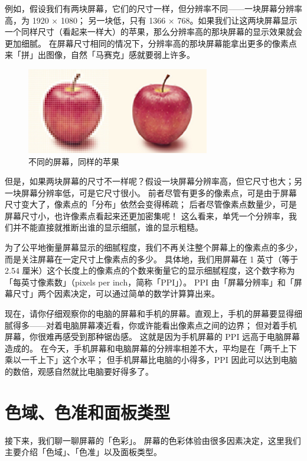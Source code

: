 例如，假设我们有两块屏幕，它们的尺寸一样，但分辨率不同——一块屏幕分辨率高，为 1920 × 1080；
另一块低，只有 1366 × 768。如果我们让这两块屏幕显示一个同样尺寸（看起来一样大）的苹果，那么分辨率高的那块屏幕的显示效果就会更加细腻。
在屏幕尺寸相同的情况下，分辨率高的那块屏幕能拿出更多的像素点来「拼」出图像，自然「马赛克」感就要弱上许多。

\begin{figure}[htb!]
  \centering
  \includegraphics[width=8cm]{assets/Different_Apple.jpg}
  \caption{不同的屏幕，同样的苹果}
  \label{Different_Apple}
\end{figure}

但是，如果两块屏幕的尺寸不一样呢？假设一块屏幕分辨率高，但它尺寸也大；另一块屏幕分辨率低，可是它尺寸很小。
前者尽管有更多的像素点，可是由于屏幕尺寸变大了，像素点的「分布」依然会变得稀疏；
后者尽管像素点数量少，可是屏幕尺寸小，也许像素点看起来还更加密集呢！
这么看来，单凭一个分辨率，我们并不能直接就推断出谁的显示细腻，谁的显示粗糙。

为了公平地衡量屏幕显示的细腻程度，我们不再关注整个屏幕上的像素点的多少，而是关注屏幕在一定尺寸上像素点的多少。
具体地，我们用屏幕在 1 英寸（等于 2.54 厘米）这个长度上的像素点的个数来衡量它的显示细腻程度，这个数字称为「每英寸像素数」（pixels per inch，简称「PPI」）。
PPI 由「屏幕分辨率」和「屏幕尺寸」两个因素决定，可以通过简单的数学计算算出来。

现在，请你仔细观察你的电脑的屏幕和手机的屏幕。直观上，手机的屏幕要显得细腻得多——对着电脑屏幕凑近看，你或许能看出像素点之间的边界；
但对着手机屏幕，你很难再感受到那种锯齿感。
这就是因为手机屏幕的 PPI 远高于电脑屏幕造成的。
在今天，手机屏幕和电脑屏幕的分辨率相差不大，平均是在「两千上下乘以一千上下」这个水平；
但手机屏幕比电脑的小得多，PPI 因此可以达到电脑的数倍，观感自然就比电脑要好得多了。

\section{色域、色准和面板类型}

接下来，我们聊一聊屏幕的「色彩」。
屏幕的色彩体验由很多因素决定，这里我们主要介绍「色域」、「色准」以及面板类型。

